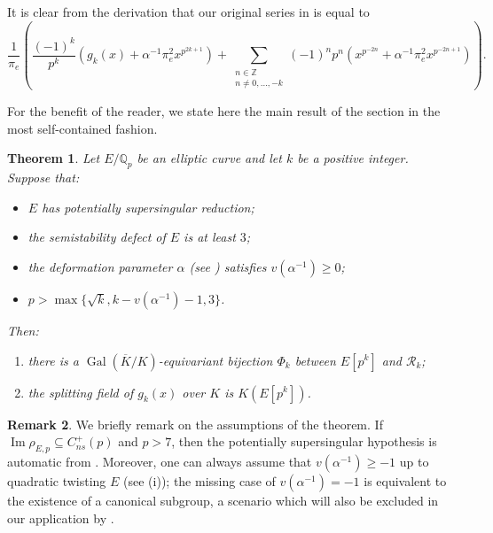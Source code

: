 \documentclass{amsart}
\newcommand{\op}[1]{\operatorname{#1}}
\newcommand{\Qp}{\mathbb{Q}_p}
\newtheorem{theorem}{Theorem}
\theoremstyle{definition}
\newtheorem{remark}[theorem]{Remark}
\newcommand{\Z}{\mathbb{Z}}
\numberwithin{theorem}{section}
\numberwithin{equation}{section}
\begin{document}
It is clear from the derivation that our original series in  is equal to
\begin{equation}\label{eqn: gk to series}
\frac{1}{\pi_e} \left( \frac{(-1)^k}{p^k} (g_k(x)+\alpha^{-1}\pi_e^2x^{p^{2k+1}}) + \sum_{\substack{n \in \Z \\ n \neq 0,\ldots,-k}} (-1)^np^n \left( x^{p^{-2n}} + \alpha^{-1}\pi_e^2x^{p^{-2n+1}} \right) \right).
\end{equation}

For the benefit of the reader, we state here the main result of the section in the most self-contained fashion.

\begin{theorem}\label{thm: p2 torsion points correspond to roots of g}
Let $E/\Qp$ be an elliptic curve and let $k$ be a positive integer. Suppose that:
\begin{itemize}
    \item $E$ has potentially supersingular reduction;
    \item the semistability defect of $E$ is at least $3$;
    \item the deformation parameter $\alpha$ (see ) satisfies $v(\alpha^{-1}) \geq 0$;
    \item $p > \max\{\sqrt{k}, k-v(\alpha^{-1}) -1, 3\}$.
\end{itemize}
Then:
\begin{enumerate}
    \item there is a $\op{Gal}(\overline{K}/K)$-equivariant bijection $\Phi_k$ between $E[p^k]$ and $\mathcal{R}_k$;
    \item the splitting field of $g_k(x)$ over $K$ is $K(E[p^k])$.
\end{enumerate}
\end{theorem}


\begin{remark}\label{rmk: canonical subgp}
    We briefly remark on the assumptions of the theorem. If $\op{Im} \rho_{E,p} \subseteq C_{ns}^+(p)$ and $p>7$, then the potentially supersingular hypothesis is automatic from .
    Moreover, one can always assume that $v(\alpha^{-1})\geq -1$ up to quadratic twisting $E$ (see (i)); the missing case of $v(\alpha^{-1})=-1$ is equivalent to the existence of a canonical subgroup, a scenario which will also be excluded in our application by .
\end{remark}
\end{document}
